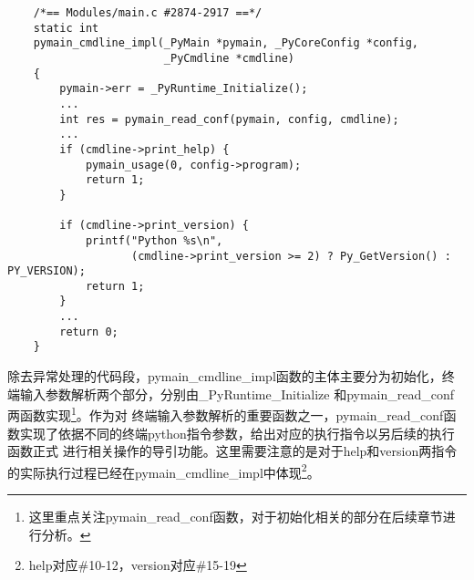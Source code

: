\documentclass[UTF8]{book}
\begin{document}
\begin{lstlisting}
    /*== Modules/main.c #2874-2917 ==*/
    static int
    pymain_cmdline_impl(_PyMain *pymain, _PyCoreConfig *config,
                        _PyCmdline *cmdline)
    {
        pymain->err = _PyRuntime_Initialize();
        ...
        int res = pymain_read_conf(pymain, config, cmdline);
        ...
        if (cmdline->print_help) {
            pymain_usage(0, config->program);
            return 1;
        }

        if (cmdline->print_version) {
            printf("Python %s\n",
                   (cmdline->print_version >= 2) ? Py_GetVersion() : PY_VERSION);
            return 1;
        }
        ...
        return 0;
    }
\end{lstlisting}\par
除去异常处理的代码段，pymain\_cmdline\_impl函数的主体主要分为初始化，终端输入参数解析两个部分，分别由\_PyRuntime\_Initialize
和pymain\_read\_conf两函数实现\footnote{这里重点关注pymain\_read\_conf函数，对于初始化相关的部分在后续章节进行分析。}。作为对
终端输入参数解析的重要函数之一，pymain\_read\_conf函数实现了依据不同的终端python指令参数，给出对应的执行指令以另后续的执行函数正式
进行相关操作的导引功能。这里需要注意的是对于help和version两指令的实际执行过程已经在pymain\_cmdline\_impl中体现\footnote[1]{help对应\#10-12，version对应\#15-19}。
\end{document}
